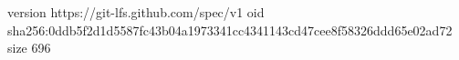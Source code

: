 version https://git-lfs.github.com/spec/v1
oid sha256:0ddb5f2d1d5587fc43b04a1973341cc4341143cd47cee8f58326ddd65e02ad72
size 696
